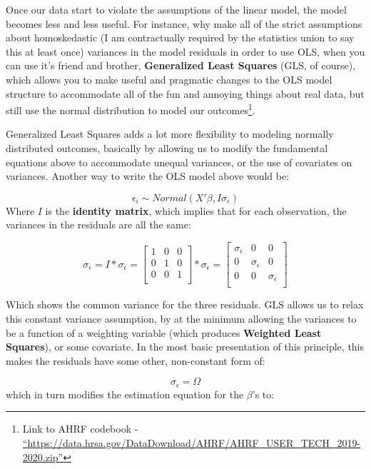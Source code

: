 \documentclass[
]{article}
\begin{document}
Once our data start to violate the assumptions of the linear model, the model becomes less and less useful. For instance, why make all of the strict assumptions about homoskedastic (I am contractually required by the statistics union to say this at least once) variances in the model residuals in order to use OLS, when you can use it's friend and brother, \textbf{Generalized Least Squares} (GLS, of course), which allows you to make useful and pragmatic changes to the OLS model structure to accommodate all of the fun and annoying things about real data, but still use the normal distribution to model our outcomes\footnote{Link to AHRF codebook - \href{https://data.hrsa.gov/DataDownload/AHRF/AHRF_USER_TECH_2019-2020.zip}{``https://data.hrsa.gov/DataDownload/AHRF/AHRF\_USER\_TECH\_2019-2020.zip''}}.

Generalized Least Squares adds a lot more flexibility to modeling normally distributed outcomes, basically by allowing us to modify the fundamental equations above to accommodate unequal variances, or the use of covariates on variances. Another way to write the OLS model above would be:

\[\epsilon_i \sim Normal(X'\beta, I\sigma_\epsilon)\] Where \(I\) is the \textbf{identity matrix}, which implies that for each observation, the variances in the residuals are all the same:

\[\sigma_{\epsilon}  = I * \sigma_{\epsilon} = \begin{bmatrix}
1& 0& 0 \\
0& 1& 0 \\
0& 0& 1\\
\end{bmatrix} *\sigma_{\epsilon} = \begin{bmatrix}
\sigma_{\epsilon}& 0& 0 \\
0& \sigma_{\epsilon}& 0 \\
0& 0 & \sigma_{\epsilon} \\
\end{bmatrix}\]

Which shows the common variance for the three residuals. GLS allows us to relax this constant variance assumption, by at the minimum allowing the variances to be a function of a weighting variable (which produces \textbf{Weighted Least Squares}), or some covariate. In the most basic presentation of this principle, this makes the residuals have some other, non-constant form of:

\[\sigma_{\epsilon}  = \Omega\] which in turn modifies the estimation equation for the \(\beta\)'s to:
\end{document}
